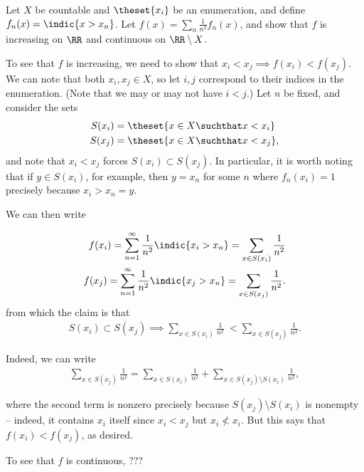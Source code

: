 \begin{problem}
  Let $X$ be countable and $\theset{x_i}$ be an enumeration, and define $f_n(x) = \indic{x > x_n}$. Let $f(x) = \sum_n \frac 1 {n^2} f_n(x)$, and show that $f$ is increasing on $\RR$ and continuous on $\RR\setminus X$.
\end{problem}

\begin{solution}\hfill
  To see that $f$ is increasing, we need to show that $x_i < x_j \implies f(x_i) < f(x_j)$.
  We can note that both $x_i, x_j \in X$, so let $i,j$ correspond to their indices in the enumeration.
  (Note that we may or may not have $i < j$.) Let $n$ be fixed, and consider the sets
\[
  \begin{align*}
    S(x_i) &= \theset{x\in X \suchthat x < x_i} \\
    S(x_j) &= \theset{x\in X \suchthat x < x_j}
  ,\end{align*}
\]
and note that $x_i < x_j$ forces $S(x_i) \subset S(x_j)$. In particular, it is worth noting that if $y\in S(x_i)$, for example, then $y = x_n$ for some $n$ where $f_n(x_i) = 1$ precisely because $x_i > x_n = y$.

We can then write

\[
  \begin{align*}
    f(x_i) = \sum_{n=1}^\infty \frac 1 {n^2} \indic{x_i > x_n} = \sum_{x \in S(x_i)}\frac 1 {n^2} \\
    f(x_j) = \sum_{n=1}^\infty \frac 1 {n^2} \indic{x_j > x_n} = \sum_{x \in S(x_j)}\frac 1 {n^2}
  .\end{align*}
\]
  from which the claim is that
\[
  \begin{align*}
    S(x_i) \subset S(x_j) \implies \sum_{x \in S(x_i)}\frac 1 {n^2} ~< \sum_{x\in S(x_j)} \frac 1 {n^2}
  .\end{align*}
\]

  Indeed, we can write
\[
  \begin{align*}
    \sum_{x\in S(x_j)} \frac 1 {n^2} = \sum_{x\in S(x_i)} \frac 1 {n^2} + \sum_{x\in S(x_j)\setminus S(x_i)} \frac 1 {n^2}
  ,\end{align*}
\]

where the second term is nonzero precisely because $S(x_j)\setminus S(x_i)$ is nonempty -- indeed, it contains $x_i$ itself since $x_i < x_j$ but $x_i \not < x_i$. But this says that $f(x_i) < f(x_j)$, as desired.

To see that $f$ is continuous, ???

\end{solution}

